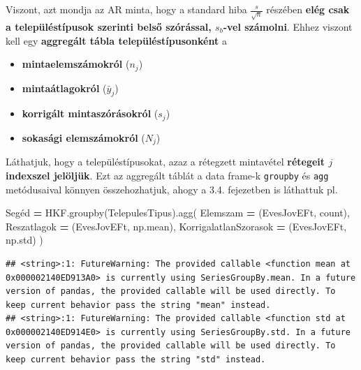 \documentclass[
]{book}
\newenvironment{Shaded}{\begin{snugshade}}{\end{snugshade}}
\newcommand{\NormalTok}[1]{#1}
\newcommand{\OperatorTok}[1]{\textcolor[rgb]{0.81,0.36,0.00}{\textbf{#1}}}
\newcommand{\StringTok}[1]{\textcolor[rgb]{0.31,0.60,0.02}{#1}}
\providecommand{\tightlist}{%
  \setlength{\itemsep}{0pt}\setlength{\parskip}{0pt}}
\begin{document}
Viszont, azt mondja az AR minta, hogy a standard hiba \(\frac{s}{\sqrt{n}}\) részében \textbf{elég csak a településtípusok szerinti belső szórással, \(s_b\)-vel számolni}. Ehhez viszont kell egy \textbf{aggregált tábla településtípusonként} a

\begin{itemize}
\tightlist
\item
  \textbf{mintaelemszámokról} (\(n_j\))
\item
  \textbf{mintaátlagokról} (\(\bar{y}_j\))
\item
  \textbf{korrigált mintaszórásokról} (\(s_j\))
\item
  \textbf{sokasági elemszámokról} (\(N_j\))
\end{itemize}

Láthatjuk, hogy a településtípusokat, azaz a rétegzett mintavétel \textbf{rétegeit \(j\) indexszel jelöljük}. Ezt az aggregált táblát a data frame-k \texttt{groupby} és \texttt{agg} metódusaival könnyen összehozhatjuk, ahogy a 3.4. fejezetben is láthattuk pl.

\begin{Shaded}
\begin{Highlighting}[]
\NormalTok{Segéd }\OperatorTok{=}\NormalTok{ HKF.groupby(}\StringTok{\textquotesingle{}TelepulesTipus\textquotesingle{}}\NormalTok{).agg(}
\NormalTok{  Elemszam }\OperatorTok{=}\NormalTok{ (}\StringTok{\textquotesingle{}EvesJovEFt\textquotesingle{}}\NormalTok{, }\StringTok{\textquotesingle{}count\textquotesingle{}}\NormalTok{),}
\NormalTok{  Reszatlagok }\OperatorTok{=}\NormalTok{ (}\StringTok{\textquotesingle{}EvesJovEFt\textquotesingle{}}\NormalTok{, np.mean),}
\NormalTok{  KorrigalatlanSzorasok }\OperatorTok{=}\NormalTok{ (}\StringTok{\textquotesingle{}EvesJovEFt\textquotesingle{}}\NormalTok{, np.std)}
\NormalTok{)}
\end{Highlighting}
\end{Shaded}

\begin{verbatim}
## <string>:1: FutureWarning: The provided callable <function mean at 0x000002140ED913A0> is currently using SeriesGroupBy.mean. In a future version of pandas, the provided callable will be used directly. To keep current behavior pass the string "mean" instead.
## <string>:1: FutureWarning: The provided callable <function std at 0x000002140ED914E0> is currently using SeriesGroupBy.std. In a future version of pandas, the provided callable will be used directly. To keep current behavior pass the string "std" instead.
\end{verbatim}
\end{document}
